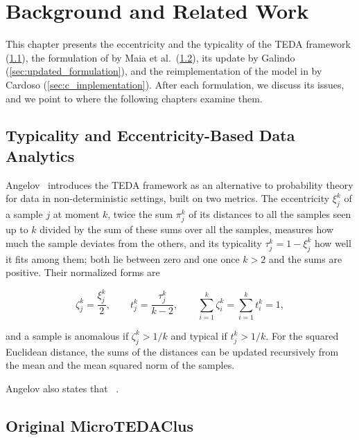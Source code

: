 \chapter{Background and Related Work}
\label{chap:background_relatedwork}

This chapter presents the eccentricity and the typicality of the TEDA framework (\cref{sec:teda}), the formulation of \MicroTEDAClus by Maia et al.\ (\cref{sec:original_formulation}), its update by Galindo (\cref{sec:updated_formulation}), and the reimplementation of the model in  by Cardoso (\cref{sec:c_implementation}). After each formulation, we discuss its issues, and we point to where the following chapters examine them.

\section{Typicality and Eccentricity-Based Data Analytics}
\label{sec:teda}

Angelov~\cite{angelov2014outside} introduces the TEDA framework as an alternative to probability theory for data in non-deterministic settings, built on two metrics. The eccentricity $\xi^k_j$ of a sample $j$ at moment $k$, twice the sum $\pi^k_j$ of its distances to all the samples seen up to $k$ divided by the sum of these sums over all the samples, measures how much the sample deviates from the others, and its typicality $\tau^k_j = 1 - \xi^k_j$ how well it fits among them; both lie between zero and one once $k > 2$ and the sums are positive. Their normalized forms are

\begin{equation}
    \zeta^k_j = \frac{\xi^k_j}{2}, \qquad t^k_j = \frac{\tau^k_j}{k - 2}, \qquad \sum_{i=1}^{k} \zeta^k_i = \sum_{i=1}^{k} t^k_i = 1,
    \label{eq:normalized_typicality}
\end{equation}

and a sample is anomalous if $\zeta^k_j > 1/k$ and typical if $t^k_j > 1/k$. For the squared Euclidean distance, the sums of the distances can be updated recursively from the mean and the mean squared norm of the samples.

Angelov also states that ~\cite{mahalanobis1936generalized}.

\section{Original MicroTEDAClus}
\label{sec:original_formulation}

